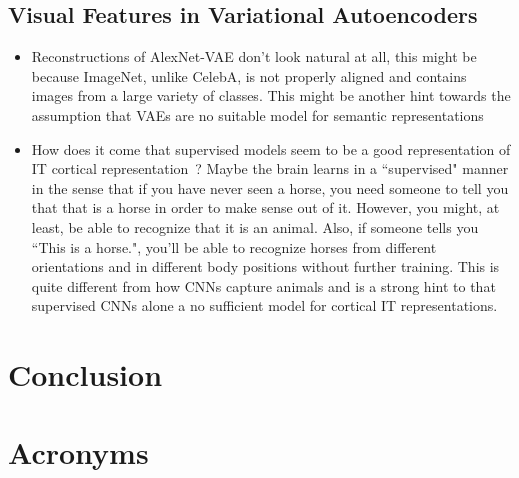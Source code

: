 \documentclass[11pt]{article}
\newcounter{savepage}
\begin{document}
    \subsection{Visual Features in Variational Autoencoders}\label{subsec:discussion_visual_features_in_variational_autoencoders}
    \begin{itemize}
        \item Reconstructions of AlexNet-VAE don't look natural at all, this might be because ImageNet, unlike CelebA, is not properly aligned and contains images from a large variety of classes.
        This might be another hint towards the assumption that \acp{VAE} are no suitable model for semantic representations
        \item How does it come that supervised models seem to be a good representation of \ac{IT} cortical representation~\citep{khaligh2014deep}? Maybe the brain learns in a ``supervised" manner in the sense that if you have never seen a horse, you need someone to tell you that that is a horse in order to make sense out of it.
        However, you might, at least, be able to recognize that it is an animal.
        Also, if someone tells you ``This is a horse.", you'll be able to recognize horses from different orientations and in different body positions without further training.
        This is quite different from how \acp{CNN} capture animals and is a strong hint to that supervised \acp{CNN} alone a no sufficient model for cortical IT representations.
    \end{itemize}


    \section{Conclusion}\label{sec:conclusion}

    \newpage
    \printbibliography

    \newpage
    \setcounter{page}{\thesavepage}
    \section*{Acronyms}
    \begin{acronym}[TDMA]
    \end{acronym}
    \newpage
    \listoffigures
    \newpage
    \listoftables
    \newpage
    
\end{document}
